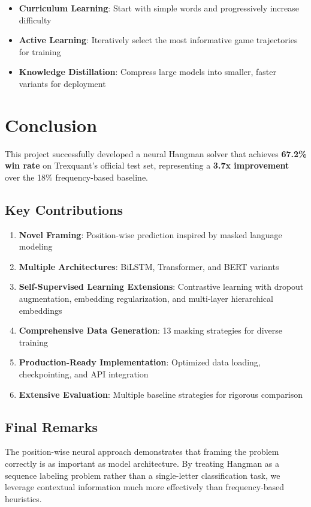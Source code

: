 \documentclass[12pt,a4paper]{article}
\begin{document}
\begin{itemize}
    \item \textbf{Curriculum Learning}: Start with simple words and progressively increase difficulty
    \item \textbf{Active Learning}: Iteratively select the most informative game trajectories for training
    \item \textbf{Knowledge Distillation}: Compress large models into smaller, faster variants for deployment
\end{itemize}

\section{Conclusion}

This project successfully developed a neural Hangman solver that achieves \textbf{67.2\% win rate} on Trexquant's official test set, representing a \textbf{3.7x improvement} over the 18\% frequency-based baseline.

\subsection{Key Contributions}

\begin{enumerate}
    \item \textbf{Novel Framing}: Position-wise prediction inspired by masked language modeling
    \item \textbf{Multiple Architectures}: BiLSTM, Transformer, and BERT variants
    \item \textbf{Self-Supervised Learning Extensions}: Contrastive learning with dropout augmentation, embedding regularization, and multi-layer hierarchical embeddings
    \item \textbf{Comprehensive Data Generation}: 13 masking strategies for diverse training
    \item \textbf{Production-Ready Implementation}: Optimized data loading, checkpointing, and API integration
    \item \textbf{Extensive Evaluation}: Multiple baseline strategies for rigorous comparison
\end{enumerate}

\subsection{Final Remarks}

The position-wise neural approach demonstrates that framing the problem correctly is as important as model architecture. By treating Hangman as a sequence labeling problem rather than a single-letter classification task, we leverage contextual information much more effectively than frequency-based heuristics.
\end{document}
